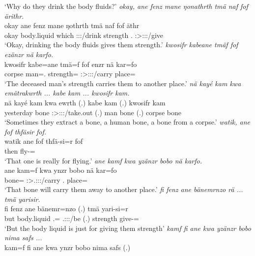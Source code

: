 \begin{exe}
	\trans `Why do they drink the body fluids?'
	\emph{okay, ane fenz mane ŋonathrth tmä naf fof ärithr.}\\
	\gll okay ane fenz mane ŋothrth tmä naf fof äthr\\
	okay {\Dem} body.liquid which \Stpl:\Sbj:\Nonpast:\Ipfv/drink strength \Tsg.{\Erg} {\Emph} \Stsg:\Sbj>\Stpl:\Io:\Nonpast:\Ipfv/give\\
	\trans `Okay, drinking the body fluids gives them strength.'
	\emph{kwosifr kabeane tmäf fof ezänzr nä karfo.}\\
	\gll kwosifr kabe=ane tmä=f fof enzr nä kar=fo\\
	corpse man=\Poss.{\Sg} strength={\Erg} {\Emph} \Stsg:\Sbj>\Stpl:\Obj:\Nonpast:\Ipfv/carry {\Indf} place=\All\\
	\trans `The deceased man's strength carries them to another place.'
	\emph{nä kayé kam kwa emätrakwrth ... kabe kam ... kwosifr kam.}\\
	\gll nä kayé kam kwa ewrth (.) kabe kam (.) kwosifr kam\\
	{\Indf} yesterday bone {\Fut} \Stpl:\Sbj>\Stpl:\Obj:\Nonpast:\Ipfv/take.out (.) man bone (.) corpse bone\\
	\trans `Sometimes they extract a bone, a human bone, a bone from a corpse.'
	\emph{watik, ane fof thfäsir fof.}\\
	\gll watik ane fof thfä-si=r fof\\
	then {\Dem} {\Emph} fly-\Nmlz={\Purp} {\Emph}\\
	\trans `That one is really for flying.'
	\emph{ane kamf kwa yzänzr bobo nä karfo.}\\
	\gll ane kam=f kwa ynzr bobo nä kar=fo\\
	{\Dem} bone={\Erg} {\Fut} \Stsg:\Sbj>\Tsg.\Masc:\Obj:\Nonpast:\Ipfv/carry \Med.{\All} {\Indf} place=\All\\
	\trans `That bone will carry them away to another place.'
	\emph{fi fenz ane bänemrnzo rä ... tmä yarisir.}\\
	\gll fi fenz ane bänemr=nzo  (.) tmä yari-si=r\\
	but body.liquid {\Dem} \Recog.\Purp={\Only} \Tsg.\F:\Sbj:\Nonpast:\Ipfv/be (.) strength give-\Nmlz=\Purp\\
	\trans `But the body liquid is just for giving them strength'
	\emph{kamf fi ane kwa yzänzr bobo nima safs ...}\\
	\gll kam=f fi ane kwa ynzr bobo nima safs (.)\\

\end{exe}
